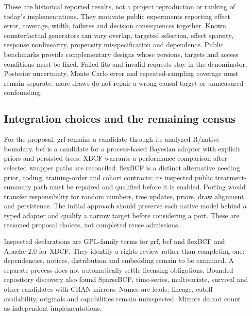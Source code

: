 These are historical reported results, not a project reproduction or ranking of today's implementations. They motivate public experiments reporting effect error, coverage, width, failures and decision consequences together. Known counterfactual generators can vary overlap, targeted selection, effect sparsity, response nonlinearity, propensity misspecification and dependence. Public benchmarks provide complementary designs whose versions, targets and access conditions must be fixed. Failed fits and invalid requests stay in the denominator. Posterior uncertainty, Monte Carlo error and repeated-sampling coverage must remain separate: more draws do not repair a wrong causal target or unmeasured confounding.~\citep{exec21_cxx_hahn,exec21_cxx_reference}

\subsection{Integration choices and the remaining census}
\label{exec21:cxx-integration}
For the proposal, grf remains a candidate through its analyzed R/native boundary. bcf is a candidate for a process-based Bayesian adapter with explicit priors and persisted trees. XBCF warrants a performance comparison after selected wrapper paths are reconciled. flexBCF is a distinct alternative needing prior, coding, training-order and cohort contracts; its inspected public treatment-summary path must be repaired and qualified before it is enabled. Porting would transfer responsibility for random numbers, tree updates, priors, draw alignment and persistence. The initial approach should preserve each native model behind a typed adapter and qualify a narrow target before considering a port. These are reasoned proposal choices, not completed reuse admissions.~\citep{exec21_cxx_grf,exec21_cxx_bcf,exec21_cxx_xbcf,exec21_cxx_flexbcf}

Inspected declarations are GPL-family terms for grf, bcf and flexBCF and Apache 2.0 for XBCF. They identify a rights review rather than completing one: dependencies, notices, distribution and embedding remain to be examined. A separate process does not automatically settle licensing obligations. Bounded repository discovery also found SparseBCF, time-series, multivariate, survival and other candidates with CRAN mirrors. Names are leads; lineage, cutoff availability, originals and capabilities remain uninspected. Mirrors do not count as independent implementations.~\citep{exec21_cxx_grf,exec21_cxx_bcf,exec21_cxx_xbcf,exec21_cxx_flexbcf}

